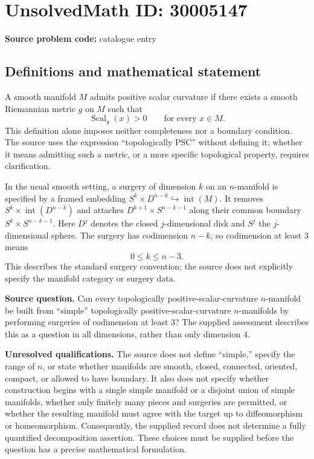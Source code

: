 \documentclass[11pt]{article}
\begin{document}
\section*{UnsolvedMath ID: 30005147}
\textbf{Source problem code:} catalogue entry
\subsection{Definitions and mathematical statement}
A smooth manifold \(M\) admits positive scalar curvature if there exists a smooth Riemannian metric \(g\) on \(M\) such that
\[
\operatorname{Scal}_g(x)>0\qquad\text{for every }x\in M.
\]
This definition alone imposes neither completeness nor a boundary condition. The source uses the expression ``topologically PSC'' without defining it; whether it means admitting such a metric, or a more specific topological property, requires clarification.

In the usual smooth setting, a surgery of dimension \(k\) on an \(n\)-manifold is specified by a framed embedding \(S^k\times D^{n-k}\hookrightarrow\operatorname{int}(M)\). It removes \(S^k\times\operatorname{int}(D^{n-k})\) and attaches \(D^{k+1}\times S^{n-k-1}\) along their common boundary \(S^k\times S^{n-k-1}\). Here \(D^j\) denotes the closed \(j\)-dimensional disk and \(S^j\) the \(j\)-dimensional sphere. The surgery has codimension \(n-k\), so codimension at least \(3\) means
\[
0\leq k\leq n-3.
\]
This describes the standard surgery convention; the source does not explicitly specify the manifold category or surgery data.

\textbf{Source question.} Can every topologically positive-scalar-curvature \(n\)-manifold be built from ``simple'' topologically positive-scalar-curvature \(n\)-manifolds by performing surgeries of codimension at least \(3\)? The supplied assessment describes this as a question in all dimensions, rather than only dimension \(4\).

\textbf{Unresolved qualifications.} The source does not define ``simple,'' specify the range of \(n\), or state whether manifolds are smooth, closed, connected, oriented, compact, or allowed to have boundary. It also does not specify whether construction begins with a single simple manifold or a disjoint union of simple manifolds, whether only finitely many pieces and surgeries are permitted, or whether the resulting manifold must agree with the target up to diffeomorphism or homeomorphism. Consequently, the supplied record does not determine a fully quantified decomposition assertion. These choices must be supplied before the question has a precise mathematical formulation.
\end{document}
